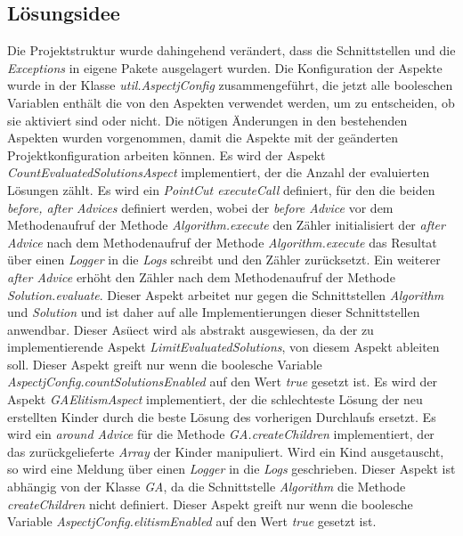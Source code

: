 \documentclass[11pt, a4paper, twoside]{article}   	%
\begin{document}
\subsection{Lösungsidee}
Die Projektstruktur wurde dahingehend verändert, dass die Schnittstellen und die \emph{Exceptions} in eigene Pakete ausgelagert wurden. Die Konfiguration der Aspekte wurde in der Klasse \emph{util.AspectjConfig} zusammengeführt, die jetzt alle booleschen Variablen enthält die von den Aspekten verwendet werden, um zu entscheiden, ob sie aktiviert sind oder nicht. Die nötigen Änderungen in den bestehenden Aspekten wurden vorgenommen, damit die Aspekte mit der geänderten Projektkonfiguration arbeiten können.
\newline
\newline
Es wird der Aspekt \emph{CountEvaluatedSolutionsAspect} implementiert, der die Anzahl der evaluierten Lösungen zählt. Es wird ein \emph{PointCut executeCall} definiert, für den die beiden \emph{before, after Advices} definiert werden, wobei der \emph{before Advice} vor dem Methodenaufruf der Methode \emph{Algorithm.execute} den Zähler initialisiert der \emph{after Advice} nach dem Methodenaufruf der Methode \emph{Algorithm.execute} das Resultat über einen \emph{Logger} in die \emph{Logs} schreibt und den Zähler zurücksetzt. Ein weiterer \emph{after Advice} erhöht den Zähler nach dem Methodenaufruf der Methode \emph{Solution.evaluate}. Dieser Aspekt arbeitet nur gegen die Schnittstellen \emph{Algorithm} und \emph{Solution} und ist daher auf alle Implementierungen dieser Schnittstellen anwendbar. Dieser Asüect wird als abstrakt ausgewiesen, da der zu implementierende Aspekt \emph{LimitEvaluatedSolutions}, von diesem Aspekt ableiten soll.  Dieser Aspekt greift nur wenn die boolesche Variable \emph{AspectjConfig.countSolutionsEnabled} auf den Wert \emph{true} gesetzt ist.
\newline
\newline
Es wird der Aspekt \emph{GAElitismAspect} implementiert, der die schlechteste Lösung der neu erstellten Kinder durch die beste Lösung des vorherigen Durchlaufs ersetzt. Es wird ein \emph{around Advice} für die Methode \emph{GA.createChildren} implementiert, der das zurückgelieferte \emph{Array} der Kinder manipuliert. Wird ein Kind ausgetauscht, so wird eine Meldung über einen \emph{Logger} in die \emph{Logs} geschrieben. Dieser Aspekt ist abhängig von der Klasse \emph{GA}, da die Schnittstelle \emph{Algorithm} die Methode \emph{createChildren} nicht definiert. Dieser Aspekt greift nur wenn die boolesche Variable \emph{AspectjConfig.elitismEnabled} auf den Wert \emph{true} gesetzt ist.
\end{document}
